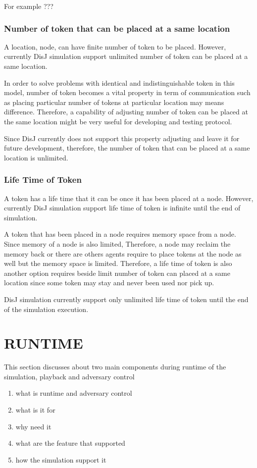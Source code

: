 For example ???

\subsubsection*{Number of token that can be placed at a same location}
A location, node, can have finite number of token to be placed. However, currently DisJ simulation support unlimited number of token can be placed at a same location.

In order to solve problems with identical and indistinguishable token in this model, number of token becomes a vital property in term of communication such as placing particular number of tokens at particular location may means difference. Therefore, a capability of adjusting number of token can be placed at the same location might be very useful for developing and testing protocol.

Since DisJ currently does not support this property adjusting and leave it for future development, therefore, the number of token that can be placed at a same location is unlimited.

\subsubsection*{Life Time of Token}
A token has a life time that it can be once it has been placed at a node. However, currently DisJ simulation support life time of token is infinite until the end of simulation.

A token that has been placed in a node requires memory space from a node. Since memory of a node is also limited, Therefore, a node may reclaim the memory back or there are others agents require to place tokens at the node as well but the memory space is limited. Therefore, a life time of token is also another option requires beside limit number of token can placed at a same location since some token may stay and never been used nor pick up.

DisJ simulation currently support only unlimited life time of token until the end of the simulation execution.




\section{RUNTIME}
This section discusses about two main components during runtime of the simulation, playback and adversary control
\begin{enumerate}
\item what is runtime and adversary control
\item what is it for
\item why need it

\item what are the feature that supported
\item how the simulation support it
\end{enumerate}

